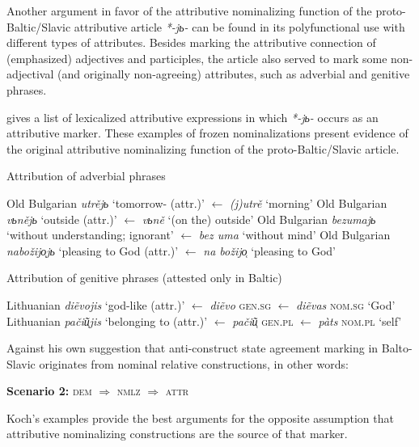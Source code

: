 Another argument in favor of the attributive nominalizing function of the proto-Baltic/Slavic attributive article \textit{*-jь-} can be found in its polyfunctional use with different types of attributes. Besides marking the attributive connection of (emphasized) adjectives and participles, the article also served to mark some non-adjectival (and originally non-agreeing) attributes, such as adverbial and genitive phrases.

\citet[467–468]{koch1999} gives a list of lexicalized attributive expressions in which \textit{*-jь-} occurs as an attributive marker. These examples of frozen nominalizations present evidence of the original attributive nominalizing function of the proto-Baltic/Slavic article. 

\begin{exe}
\ex
\begin{xlist}
\ex Attribution of adverbial phrases
\begin{xlist}
\ex Old Bulgarian \textit{utrějь} ‘tomorrow- (attr.)’ $\leftarrow$ \textit{(j)utrě} ‘morning’
\ex Old Bulgarian \textit{vьnějь} ‘outside (attr.)’ $\leftarrow$ \textit{vьně} ‘(on the) outside’ Old Bulgarian \textit{bezumajь} ‘without understanding; ignorant’ $\leftarrow$ \textit{bez uma} ‘without mind’
\ex Old Bulgarian \textit{nabožijo̜jь} ‘pleasing to God (attr.)’ $\leftarrow$ \textit{na božijo̜} ‘pleasing to God’
\end{xlist}
\ex Attribution of genitive phrases (attested only in Baltic)
\begin{xlist}
\ex Lithuanian \textit{di\~evojis} ‘god-like (attr.)’ $\leftarrow$ \textit{di\~evo} \textsc{gen.sg} $\leftarrow$ \textit{di\~evas} \textsc{nom.sg} ‘God’
\ex Lithuanian \textit{pači\~u̜jis} ‘belonging to (attr.)’ $\leftarrow$ \textit{pači\~u̜} \textsc{gen.pl} $\leftarrow$ \textit{pàts} \textsc{nom.pl} ‘self’
\end{xlist}
\end{xlist}
\end{exe}%
Against his own suggestion that anti-construct state agreement marking in Balto-Slavic originates from nominal relative constructions, in other words:
\begin{exe}
\ex \textbf{Scenario 2:} \textsc{dem $\Rightarrow$ nmlz $\Rightarrow$ attr}
\end{exe}
Koch's examples provide the best arguments for the opposite assumption that attributive nominalizing constructions are the source of that marker.

